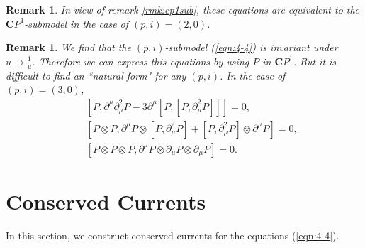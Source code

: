 \documentclass[makeidx,12pt,openany]{report}
\newtheorem{rmk}[df]{Remark}
\begin{document}
\begin{rmk}In view of remark \ref{rmk:cp1sub}, 
these equations are equivalent to the 
${\mathbf{C}}P^1$-submodel in the case of $(p,i)=(2,0)$. 
\end{rmk}
\begin{rmk}
We find that the $(p,i)$-submodel (\ref{eqn:4-4}) is invariant 
under $u \rightarrow \frac 1u$. Therefore we can express this equations 
by using $P$ in ${\mathbf{C}}P^1$. But it is difficult to find 
an ``natural form" for any $(p,i)$. In the case of $(p,i)=(3,0)$, 
\begin{eqnarray}
&& [P, \partial^{\mu}\partial_{\mu}^2 P 
    - 3\partial^{\mu}[P, [P,\partial_{\mu}^2 P]]]=0, \\
&& [P \otimes P, \partial^{\mu}P \otimes [P,\partial_{\mu}^2 P]
    + [P,\partial_{\mu}^2 P] \otimes \partial^{\mu}P]=0, \\
&& [P \otimes P \otimes P, 
     \partial^{\mu}P \otimes \partial_{\mu}P \otimes \partial_{\mu}P]=0.
\end{eqnarray}
\end{rmk}
 \section{Conserved Currents}
In this section, we construct conserved currents for the equations 
(\ref{eqn:4-4}).
\end{document}
